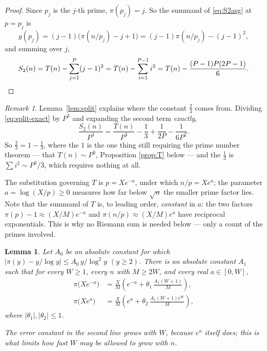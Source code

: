 \documentclass[a4paper,11pt,oneside,reqno]{amsart}
\theoremstyle{definition}
\theoremstyle{remark}
\newtheorem{remark}[definition]{Remark}
\theoremstyle{plain}
\newtheorem{lemma}[definition]{Lemma}
\begin{document}
\begin{proof}
  Since \(p_j\) is the \(j\)-th prime, \(\pi(p_j) = j\). So the summand of
  \eqref{eq:S2asg} at \(p = p_j\) is
  \[
    g(p_j) = (j-1)\bigl(\pi(n/p_j)-j+1\bigr) = (j-1)\pi(n/p_j)-(j-1)^{2},
  \]
  and summing over \(j\),
  \[
    S_2(n) = T(n)-\sum_{j = 1}^{P}(j-1)^{2}
          =T(n)-\sum_{i = 1}^{P-1}i^{2}
          =T(n)-\frac{(P-1)P(2P-1)}{6}. \qedhere
  \]
\end{proof}

\begin{remark}\label{rem:whytwothirds}
  Lemma~\ref{lem:split} explains where the constant \(\tfrac{2}{3}\) comes from.
  Dividing \eqref{eq:split-exact} by \(P^{3}\) and expanding the second term
  \emph{exactly},
  \begin{equation}\label{eq:sqexact}
    \frac{S_2(n)}{P^{3}} = \frac{T(n)}{P^{3}}-\frac{1}{3}+\frac 1{2P}-\frac 1{6P^{2}} .
  \end{equation}
  So \(\tfrac{2}{3} = 1-\tfrac{1}{3}\), where the \(1\) is the one thing still requiring
  the prime number theorem --- that \(T(n) \sim P^{3}\), Proposition
  \ref{prop:T} below --- and the \(\tfrac{1}{3}\) is \(\sum i^{2} \sim P^{3}/3\),
  which requires nothing at all.
\end{remark}

The substitution governing \(T\) is \(p = Xe^{-a}\), under which \(n/p = Xe^{a}\);
the parameter \(a = \log(X/p) \ge 0\) measures how far below \(\sqrt n\) the
smaller prime factor lies. Note that the summand of \(T\) is, to leading order,
\emph{constant} in \(a\): the two factors \(\pi(p)-1 \approx (X/M)e^{-a}\) and
\(\pi(n/p) \approx (X/M)e^{a}\) have reciprocal exponentials. This is why no
Riemann sum is needed below --- only a count of the primes involved.

\begin{lemma}\label{lem:pnt-unif}
  Let \(A_0\) be an absolute constant for which
  \(|\pi(y)-y/\log y|\le A_0\,y/\log^{2}y\) \((y \ge 2)\). There is an absolute
  constant \(A_1\) such that for every \(W \ge 1\), every \(n\) with
  \(M \ge 2W\), and every real \(a \in [0,W]\),
  \begin{equation}\label{eq:pnt-sub}
    \begin{aligned}
      \pi\bigl(Xe^{-a}\bigr)
        &= \frac{X}{M}\left(e^{-a}+\theta_1\,\frac{A_1(W+1)}{M}\right),\\
      \pi\bigl(Xe^{a}\bigr)
        &= \frac{X}{M}\left(e^{a}+\theta_2\,\frac{A_1(W+1)e^{W}}{M}\right),
    \end{aligned}
  \end{equation}
  where \(|\theta_1|,|\theta_2|\le 1\).

  The error constant in the second line grows with \(W\), because \(e^{a}\)
  itself does; this is what limits how fast \(W\) may be allowed to grow with
  \(n\).
\end{lemma}
\end{document}
